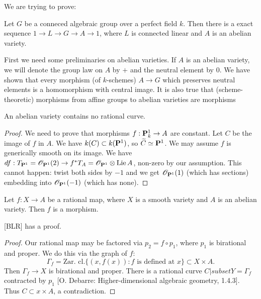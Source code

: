 We are trying to prove: 

\begin{theo}
Let $G$ be a conneced algebraic group over a perfect field $k$. Then there is a 
exact sequence $1 \to L \to G \to A \to 1$, where $L$ is connected linear and 
$A$ is an abelian variety. 
\end{theo}

First we need some preliminaries on abelian varieties. If $A$ is an abelian 
variety, we will denote the group law on $A$ by $+$ and the neutral element 
by $0$. We have shown that every morphism (of $k$-schemes) $A\to G$ which 
preserves neutral elements is a homomorphism with central image. It is also 
true that (scheme-theoretic) morphisms from affine groups to abelian varieties 
are morphisms 

\begin{prop}
An abelian variety contains no rational curve. 
\end{prop}
\begin{proof}
We need to prove that morphisms $f:\mathbf{P}_k^1 \to A$ are constant. Let $C$ be 
the image of $f$ in $A$. We have $k(C)\subset k(\mathbf{P}^1)$, so 
$\widetilde C\simeq \mathbf{P}^1$. We may assume $f$ is generically smooth on its 
image. We have 
$d f:T_{\mathbf{P}^1} = \mathscr{O}_{\mathbf{P}^1}(2) \to f^\ast T_A = \mathscr{O}_{\mathbf{P}^1}\otimes \operatorname{Lie} A$, 
non-zero by our assumption. This cannot happen: twist both sides by $-1$ and 
we get $\mathscr{O}_{\mathbf{P}^1}(1)$ (which has sections) embedding into 
$\mathscr{O}_{\mathbf{P}^1}(-1)$ (which has none). 
\end{proof}

\begin{theo}
Let $f:X\to A$ be a rational map, where $X$ is a smooth variety and $A$ is an 
abelian variety. Then $f$ is a morphism. 
\end{theo}

[BLR] has a proof. 

\begin{proof}
Our rational map may be factored via $p_2=f\circ p_1$, where $p_1$ is 
birational and proper. We do this via the graph of $f$:
\[
  \Gamma_f = \text{Zar. cl.}\{(x,f(x)):f\text{ is defined at }x\}\subset X\times A .
\]
Then $\Gamma_f \to X$ is birational and proper. There is a rational curve 
$C|subset Y=\Gamma_f$ contracted by $p_1$ [O. Debarre: Higher-dimensional 
algebraic geometry, 1.4.3]. Thus $C\subset x\times A$, a contradiction. 
\end{proof}

